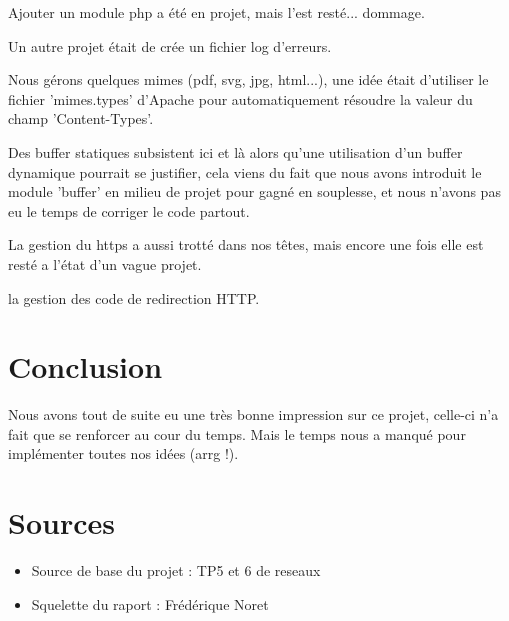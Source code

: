 \documentclass[12pt,a4paper,utf8x]{report}
\begin{document}
Ajouter un module php a été en projet, mais l'est resté... dommage.

Un autre projet était de crée un fichier log d'erreurs.

Nous gérons quelques mimes (pdf, svg, jpg, html...), une idée était d'utiliser le fichier 'mimes.types' d'Apache pour automatiquement résoudre la valeur du champ 'Content-Types'.

Des buffer statiques subsistent ici et là alors qu'une utilisation d'un buffer dynamique pourrait se justifier, cela viens du fait que nous avons introduit le module 'buffer' en milieu de projet pour gagné en souplesse, et nous n'avons pas eu le temps de corriger le code partout.

La gestion du https a aussi trotté dans nos têtes, mais encore une fois
elle est resté a l'état d'un vague projet.

la gestion des code de redirection HTTP.



\chapter{Conclusion}

Nous avons tout de suite eu une très bonne impression sur ce projet,
celle-ci n'a fait que se renforcer au cour du temps. Mais le temps nous a
manqué pour implémenter toutes nos idées (arrg !).

\chapter{Sources}


\begin{itemize}
\renewcommand{\labelitemi}{-}
\item Source de base du projet : TP5 et 6 de reseaux
\item Squelette du raport : Frédérique Noret
\end{itemize}

\nocite{*}
%
%


\end{document}
